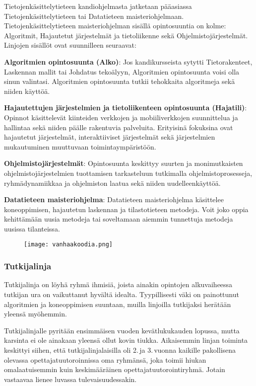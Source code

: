 \documentclass[../ala_hataile.tex]{subfiles}
\begin{document}
	Tietojenkäsittelytieteen kandiohjelmasta jatketaan pääasiassa Tietojenkäsittely\-tieteen tai Data\-tieteen maisteri\-ohjelmaan. Tietojen\-käsittely\-tieteen maisteriohjelman sisällä opinto\-suuntia on kolme: Algoritmit, Hajautetut järjestelmät ja tieto\-liikenne sekä Ohjelmisto\-järjestelmät.
	Linjojen sisällöt ovat suunnilleen
	seuraavat:
	
	\textbf{Algoritmien opintosuunta (Alko)}: Jos kandikursseista sytytti Tietorakenteet, Laskennan mallit tai Johdatus tekoälyyn, Algoritmien opintosuunta voisi olla sinun valintasi. Algoritmien opintosuunta tutkii tehokkaita algoritmeja sekä niiden käyttöä.
	
	\textbf{Hajautettujen järjestelmien ja tieto\-liikenteen opinto\-suunta (Hajatili)}: Opinnot käsittelevät kiinteiden verkkojen ja mobiili\-verkkojen suunnittelua ja hallintaa sekä niiden päälle rakentuvia palveluita. Erityisinä fokuksina ovat hajautetut järjestelmät, interaktiiviset järjestelmät sekä järjestelmien mukautuminen muuttuvaan toiminta\-ympäristöön.
	
	\textbf{Ohjelmistojärjestelmät}: Opintosuunta keskittyy suurten ja monimutkaisten ohjelmistojärjestelmien tuottamisen tarkasteluun tutkimalla ohjelmistoprosesseja, ryhmädynamiikkaa ja ohjelmiston laatua sekä niiden uudelleenkäyttöä.
	
	\textbf{Datatieteen maisteriohjelma}: Datatieteen maisteriohjelma käsittelee koneoppimisen, hajautetun laskennan ja tilastotieteen metodeja. Voit joko oppia kehittämään uusia metodeja tai soveltamaan aiemmin tunnettuja metodeja uusissa tilanteissa.
	\begin{figure}[b]
		\centering
		\texttt{[image: vanhaakoodia.png]}
	\end{figure}
	
	\subsubsection*{Tutkijalinja}
	Tutkijalinja on löyhä ryhmä ihmisiä,
	joista ainakin opintojen alkuvaiheessa tutkijan
	ura on vaikuttanut hyvältä idealta.
	Tyypillisesti väki on painottunut algoritmien
	ja koneoppimisen suuntaan, muilla
	linjoilla tutkijaksi herätään yleensä myöhemmin.
	
	Tutkijalinjalle pyritään ensimmäisen
	vuoden kevätlukukauden lopussa, mutta
	karsinta ei ole ainakaan yleensä ollut kovin
	tiukka. Aikaisemmin linjan toiminta
	keskittyi siihen, että tutkijalinjalaisilla oli
	2.\,ja 3.\,vuonna kaikille pakollisena olevassa
	opettajatuutoroinnissa oma ryhmänsä,
	joka toimii hiukan omalaatuisemmin kuin
	keskimääräinen opettajatuutorointiryhmä.
	Jotain vastaavaa lienee luvassa tulevaisuudessakin.
	
\end{document}
